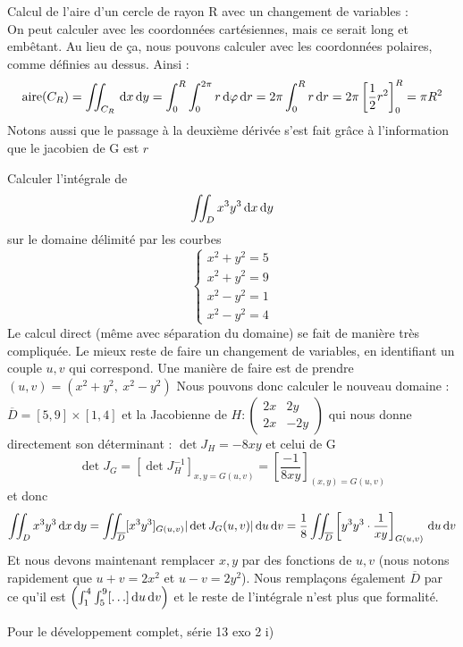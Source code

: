 \documentclass[12pt,a4paper]{article}
\renewcommand{\)}{\right)}
\renewcommand{\(}{\left(}
\begin{document}
\begin{exemple}
	Calcul de l'aire d'un cercle de rayon R avec un changement de variables :\\
	On peut calculer avec les coordonnées cartésiennes, mais ce serait long et embêtant. Au lieu de ça, nous pouvons calculer avec les coordonnées polaires, comme définies au dessus. Ainsi :
	\[\text{aire(}C_R) = \iint_{C_R} \, \mathrm d x\, \mathrm d y = \int_0^R \int_0^{2\pi} r\, \mathrm d \varphi\, \mathrm d r = 2\pi\int_0^R r \, \mathrm d r = 2\pi \left[\frac{1}{2}r^2\right]_0^R = \pi R^2\]
	Notons aussi que le passage à la deuxième dérivée s'est fait grâce à l'information que le jacobien de G est $r$
\end{exemple}
\begin{exemple}
	Calculer l'intégrale de \[\iint_D x^3y^3 \, \mathrm d x\, \mathrm d y\]
	sur le domaine délimité par les courbes
	\[\left\{\begin{array}{l}
	x^2 + y^2 = 5\\
	x^2 + y^2 = 9\\
	x^2 - y^2 = 1\\
	x^2 - y^2 = 4
	\end{array}\right.
	\]
	Le calcul direct (même avec séparation du domaine) se fait de manière très compliquée. Le mieux reste de faire un changement de variables, en identifiant un couple $u,v$ qui correspond. Une manière de faire est de prendre $(u,v) = (x^2+y^2,\ x^2-y^2)$ Nous pouvons donc calculer le nouveau domaine : $\overline{D} = [5,9]\times [1,4]$ et la Jacobienne de $H : \begin{pmatrix}
	2x & 2y\\
	2x & -2y
	\end{pmatrix}$ qui nous donne directement son déterminant : $\det J_H = -8xy$ et celui de G \[\det J_G =[\det J_H^{-1}]_{x,y = G(u,v)} = \left[\frac{-1}{8xy}\right]_{(x,y) = G(u,v)}\]
	et donc 
	\begin{align*}
	\iint_D x^3y^3 \, \mathrm d x\, \mathrm d y = \iint_{\overline{D}} [x^3y^3]_{G(u,v)} |\det J_G(u,v)| \, \mathrm d u\, \mathrm d v = \frac{1}{8}\iint_{\overline{D}} \left[y^3y^3\cdot\frac{1}{xy}\right]_{G(u,v)}\, \mathrm d u\, \mathrm d v\\
	\end{align*}
	Et nous devons maintenant remplacer $x,y$ par des fonctions de $u,v$ (nous notons rapidement que $u+v = 2x^2$ et $u-v = 2y^2$). Nous remplaçons également $\overline{D}$ par ce qu'il est $\(\int_1^4\int_5^9 [\ldots] \deriv{u}\deriv{v}\)$ et le reste de l'intégrale n'est plus que formalité.
	
	Pour le développement complet, série 13 exo 2 i)
\end{exemple}
\end{document}
